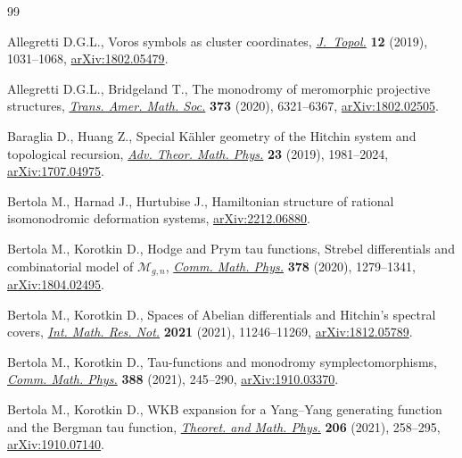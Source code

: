 \documentclass[pdftex]{sigma}
\numberwithin{equation}{section}
\theoremstyle{definition}
\begin{document}
\begin{thebibliography}{99}
\footnotesize\itemsep=0pt

Allegretti D.G.L., Voros symbols as cluster coordinates, \href{https://doi.org/10.1112/topo.12106}{\textit{J.~Topol.}}
 \textbf{12} (2019), 1031--1068, \href{https://arxiv.org/abs/1802.05479}{arXiv:1802.05479}.

Allegretti D.G.L., Bridgeland T., The monodromy of meromorphic projective
 structures, \href{https://doi.org/10.1090/tran/8093}{\textit{Trans. Amer. Math. Soc.}} \textbf{373} (2020), 6321--6367,
 \href{https://arxiv.org/abs/1802.02505}{arXiv:1802.02505}.

Baraglia D., Huang Z., Special {K}\"ahler geometry of the {H}itchin system and
 topological recursion, \href{https://doi.org/10.4310/ATMP.2019.v23.n8.a2}{\textit{Adv. Theor. Math. Phys.}} \textbf{23} (2019),
 1981--2024, \href{https://arxiv.org/abs/1707.04975}{arXiv:1707.04975}.

Bertola M., Harnad J., Hurtubise J., Hamiltonian structure of rational
 isomonodromic deformation systems, \href{https://arxiv.org/abs/2212.06880}{arXiv:2212.06880}.

Bertola M., Korotkin D., Hodge and {P}rym tau functions, {S}trebel
 differentials and combinatorial model of {$\mathcal{M}_{g,n}$}, \href{https://doi.org/10.1007/s00220-020-03819-9}{\textit{Comm.
 Math. Phys.}} \textbf{378} (2020), 1279--1341, \href{https://arxiv.org/abs/1804.02495}{arXiv:1804.02495}.

Bertola M., Korotkin D., Spaces of {A}belian differentials and {H}itchin's
 spectral covers, \href{https://doi.org/10.1093/imrn/rnz142}{\textit{Int. Math. Res. Not.}} \textbf{2021} (2021),
 11246--11269, \href{https://arxiv.org/abs/1812.05789}{arXiv:1812.05789}.

Bertola M., Korotkin D., Tau-functions and monodromy symplectomorphisms,
 \href{https://doi.org/10.1007/s00220-021-04224-6}{\textit{Comm. Math. Phys.}} \textbf{388} (2021), 245--290,
 \href{https://arxiv.org/abs/1910.03370}{arXiv:1910.03370}.

Bertola M., Korotkin D., W{KB} expansion for a {Y}ang--{Y}ang generating
 function and the {B}ergman tau function, \href{https://doi.org/10.1134/S0040577921030028}{\textit{Theoret. and Math. Phys.}}
 \textbf{206} (2021), 258--295, \href{https://arxiv.org/abs/1910.07140}{arXiv:1910.07140}.


\end{thebibliography}
\end{document}
